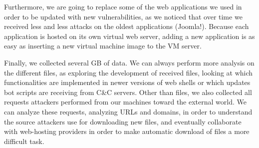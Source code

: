 Furthermore, we are going to replace some of the web applications we used in order to be updated with new vulnerabilities, as we noticed that over time we received less and less attacks on the oldest applications (Joomla!). Because each application is hosted on its own virtual web server, adding a new application is as easy as inserting a new virtual machine image to the VM server.

Finally, we collected several GB of data. We can always perform more analysis on the different files, as exploring the development of received files, looking at which functionalities are implemented in newer versions of web shells or which updates bot scripts are receiving from C\&C servers. Other than files, we also collected all requests attackers performed from our machines toward the external world. We can analyze these requests, analyzing URLs and domains, in order to understand the source attackers use for downloading new files, and eventually collaborate with web-hosting providers in order to make automatic download of files a more difficult task.
